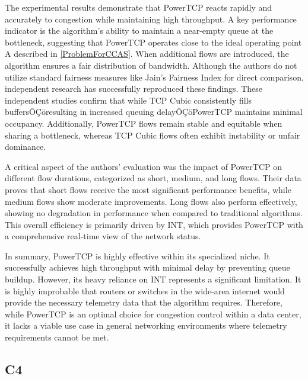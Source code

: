 \documentclass[conference]{IEEEtran}
\begin{document}
The experimental results demonstrate that PowerTCP reacts rapidly and accurately to congestion while maintaining high throughput. 
A key performance indicator is the algorithm's ability to maintain a near-empty queue at the bottleneck, suggesting that PowerTCP operates close to the ideal operating point A described in \ref{ProblemForCCAS}. 
When additional flows are introduced, the algorithm ensures a fair distribution of bandwidth. 
Although the authors do not utilize standard fairness measures like Jain's Fairness Index for direct comparison, independent research \cite{TCPSTHIRDEYE} has successfully reproduced these findings. 
These independent studies confirm that while TCP Cubic consistently fills buffersÔÇöresulting in increased queuing delayÔÇöPowerTCP maintains minimal occupancy. 
Additionally, PowerTCP flows remain stable and equitable when sharing a bottleneck, whereas TCP Cubic flows often exhibit instability or unfair dominance.

A critical aspect of the authors' evaluation was the impact of PowerTCP on different flow durations, categorized as short, medium, and long flows. 
Their data proves that short flows receive the most significant performance benefits, while medium flows show moderate improvements. 
Long flows also perform effectively, showing no degradation in performance when compared to traditional algorithms. 
This overall efficiency is primarily driven by INT, which provides PowerTCP with a comprehensive real-time view of the network status.

In summary, PowerTCP is highly effective within its specialized niche. 
It successfully achieves high throughput with minimal delay by preventing queue buildup. 
However, its heavy reliance on INT represents a significant limitation.
It is highly improbable that routers or switches in the wide-area internet would provide the necessary telemetry data that the algorithm requires. 
Therefore, while PowerTCP is an optimal choice for congestion control within a data center, it lacks a viable use case in general networking environments where telemetry requirements cannot be met.

\subsection{C4}
\end{document}
